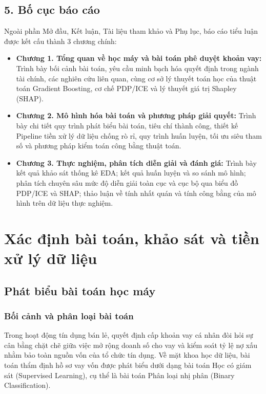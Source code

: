 \documentclass[12pt,a4paper,oneside]{report}
\begin{document}
\section*{5. Bố cục báo cáo}
Ngoài phần Mở đầu, Kết luận, Tài liệu tham khảo và Phụ lục, báo cáo tiểu luận được kết cấu thành 3 chương chính:
\begin{itemize}
    \item \textbf{Chương 1. Tổng quan về học máy và bài toán phê duyệt khoản vay:} Trình bày bối cảnh bài toán, yêu cầu minh bạch hóa quyết định trong ngành tài chính, các nghiên cứu liên quan, cùng cơ sở lý thuyết toán học của thuật toán Gradient Boosting, cơ chế PDP/ICE và lý thuyết giá trị Shapley (SHAP).
    \item \textbf{Chương 2. Mô hình hóa bài toán và phương pháp giải quyết:} Trình bày chi tiết quy trình phát biểu bài toán, tiêu chí thành công, thiết kế Pipeline tiền xử lý dữ liệu chống rò rỉ, quy trình huấn luyện, tối ưu siêu tham số và phương pháp kiểm toán công bằng thuật toán.
    \item \textbf{Chương 3. Thực nghiệm, phân tích diễn giải và đánh giá:} Trình bày kết quả khảo sát thống kê EDA; kết quả huấn luyện và so sánh mô hình; phân tích chuyên sâu mức độ diễn giải toàn cục và cục bộ qua biểu đồ PDP/ICE và SHAP; thảo luận về tính nhất quán và tính công bằng của mô hình trên dữ liệu thực nghiệm.
\end{itemize}

\chapter{Xác định bài toán, khảo sát và tiền xử lý dữ liệu}

\section{Phát biểu bài toán học máy}

\subsection{Bối cảnh và phân loại bài toán}
Trong hoạt động tín dụng bán lẻ, quyết định cấp khoản vay cá nhân đòi hỏi sự cân bằng chặt chẽ giữa việc mở rộng doanh số cho vay và kiểm soát tỷ lệ nợ xấu nhằm bảo toàn nguồn vốn của tổ chức tín dụng. Về mặt khoa học dữ liệu, bài toán thẩm định hồ sơ vay vốn được phát biểu dưới dạng bài toán Học có giám sát (Supervised Learning), cụ thể là bài toán Phân loại nhị phân (Binary Classification).
\end{document}
